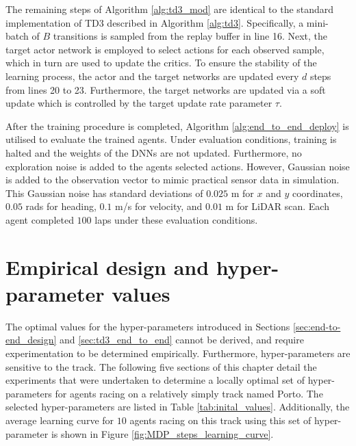 The remaining steps of Algorithm \ref{alg:td3_mod} are identical to the standard implementation of TD3 described in Algorithm \ref{alg:td3}. 
Specifically, a mini-batch of $B$ transitions is sampled from the replay buffer in line 16.
Next, the target actor network is employed to select actions for each observed sample, which in turn are used to update the critics. 
To ensure the stability of the learning process, the actor and the target networks are updated every $d$ steps from lines 20 to 23. 
Furthermore, the target networks are updated via a soft update which is controlled by the target update rate parameter $\tau$. 



After the training procedure is completed, Algorithm \ref{alg:end_to_end_deploy} is utilised to evaluate the trained agents.
Under evaluation conditions, training is halted and the weights of the DNNs are not updated.
Furthermore, no exploration noise is added to the agents selected actions. 
However, Gaussian noise is added to the observation vector to mimic practical sensor data in simulation. 
This Gaussian noise has standard deviations of $0.025$ m for $x$ and $y$ coordinates, $0.05$ rads for heading, $0.1$ m/s for velocity, and $0.01$ m for LiDAR scan. 
Each agent completed $100$ laps under these evaluation conditions.






\section{Empirical design and hyper-parameter values}\label{sec:ete_empirical_design}

The optimal values for the hyper-parameters introduced in Sections \ref{sec:end-to-end_design} and \ref{sec:td3_end_to_end} cannot be derived, 
and require experimentation to be determined empirically. 
Furthermore, hyper-parameters are sensitive to the track.
The following five sections of this chapter detail the experiments that were undertaken to determine a locally optimal set of hyper-parameters for agents racing on a relatively simply track named Porto.
The selected hyper-parameters are listed in Table \ref{tab:inital_values}.
Additionally, the average learning curve for $10$ agents racing on this track using this set of hyper-parameter is shown in Figure \ref{fig:MDP_steps_learning_curve}.

